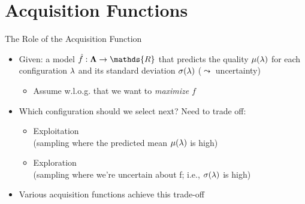 \section{Acquisition Functions}

\begin{frame}[c,fragile]{The Role of the Acquisition Function}
\begin{itemize}
  \item Given: a model $\hat{f}:\confs \rightarrow \mathds{R}$ that predicts the quality $\mu(\mathbf{\lambda})$ for each configuration $\mathbf{\lambda}$ and its standard deviation $\sigma(\mathbf{\lambda})$ ($\leadsto$ uncertainty)
  \begin{itemize}
  	\item Assume w.l.o.g. that we want to \emph{maximize} $f$
  \end{itemize}
  \medskip
  \pause
  \item Which configuration should we select next? Need to trade off: 
  \begin{itemize}
    \item \alert{Exploitation}\\(sampling where the predicted mean $\mu(\mathbf{\lambda})$ is high)
    \item \alert{Exploration}\\(sampling where we're uncertain about f; i.e., $\sigma(\mathbf{\lambda})$ is high)
  \end{itemize}
  \medskip
  \pause
  \item Various acquisition functions achieve this trade-off
\end{itemize}

\end{frame}


